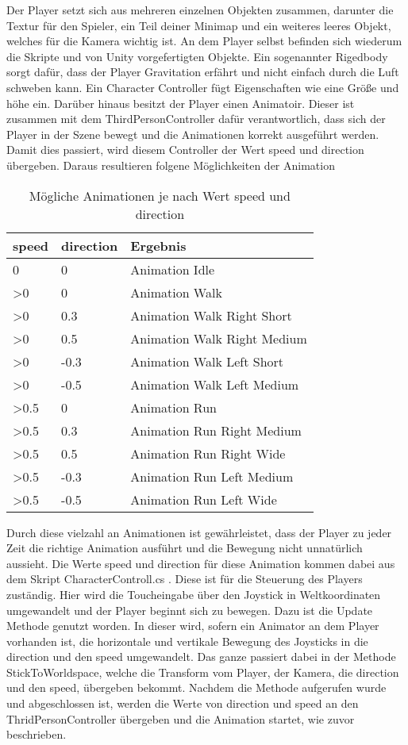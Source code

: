 Der Player setzt sich aus mehreren einzelnen Objekten zusammen, darunter die Textur für den Spieler, ein Teil deiner Minimap und ein weiteres leeres Objekt, welches für die Kamera wichtig ist. An dem Player selbst befinden sich wiederum die Skripte und von Unity vorgefertigten Objekte. Ein sogenannter Rigedbody sorgt dafür, dass der Player Gravitation erfährt und nicht einfach durch die Luft schweben kann. Ein Character Controller fügt Eigenschaften wie eine Größe und höhe ein. Darüber hinaus besitzt der Player einen Animatoir. Dieser ist zusammen mit dem ThirdPersonController dafür verantwortlich, dass sich der Player in der Szene bewegt und die Animationen korrekt ausgeführt werden. Damit dies passiert, wird diesem Controller der Wert speed und direction übergeben. Daraus resultieren folgene Möglichkeiten der Animation

 \begin{table}[htpb]
 \begin{tabular}{|l|l|l|}
 \hline
  speed & direction & Ergebnis \\
 \hline
  0 & 0 & Animation Idle \\
  >0 & 0 & Animation Walk \\
  >0 & 0.3 & Animation Walk Right Short \\
  >0 & 0.5 & Animation Walk Right Medium \\
  >0 & -0.3 & Animation Walk Left Short \\
  >0 & -0.5 & Animation Walk Left Medium \\
  >0.5 & 0 & Animation Run \\
  >0.5 & 0.3 & Animation Run Right Medium \\
  >0.5 & 0.5 & Animation Run Right Wide \\
  >0.5 & -0.3 & Animation Run Left Medium \\
  >0.5 & -0.5 & Animation Run Left Wide \\ \hline
 \end{tabular}
  \caption{Mögliche Animationen je nach Wert speed und direction}
 \label{tab:tabspeeddirection}
 \end{table}
 
Durch diese vielzahl an Animationen ist gewährleistet, dass der Player zu jeder Zeit die richtige Animation ausführt und die Bewegung nicht unnatürlich aussieht. Die Werte speed und direction für diese Animation kommen dabei aus dem Skript CharacterControll.cs . Diese ist für die Steuerung des Players zuständig. Hier wird die Toucheingabe über den Joystick in Weltkoordinaten umgewandelt und der Player beginnt sich zu bewegen. Dazu ist die Update Methode genutzt worden. In dieser wird, sofern ein Animator an dem Player vorhanden ist, die horizontale und vertikale Bewegung des Joysticks in die direction und den speed umgewandelt. Das ganze passiert dabei in der Methode StickToWorldspace, welche die Transform vom Player, der Kamera, die direction und den speed, übergeben bekommt. Nachdem die Methode aufgerufen wurde und abgeschlossen ist, werden die Werte von direction und speed an den ThridPersonController übergeben und die Animation startet, wie zuvor beschrieben.


